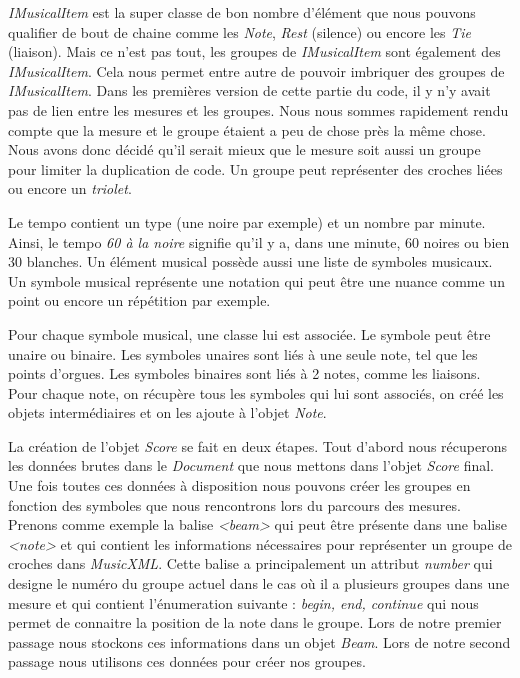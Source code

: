 \par
\emph{IMusicalItem} est la super classe de bon nombre d'élément que nous pouvons qualifier
de bout de chaine comme les \emph{Note}, \emph{Rest} (silence) ou encore les \emph{Tie} (liaison).
Mais ce n'est pas tout, les groupes de \emph{IMusicalItem} sont également des \emph{IMusicalItem}.
Cela nous permet entre autre de pouvoir imbriquer des groupes de \emph{IMusicalItem}.
Dans les premières version de cette partie du code, il y n'y avait pas de lien entre les
mesures et les groupes. Nous nous sommes rapidement rendu compte que la mesure et le groupe étaient
a peu de chose près la même chose. Nous avons donc décidé qu'il serait mieux que le mesure soit
aussi un groupe pour limiter la duplication de code. Un groupe peut représenter des croches liées ou
encore un \emph{triolet}.

\par
Le tempo contient un type (une noire par exemple) et un nombre par minute. Ainsi, le tempo \emph{60 à la noire} signifie qu'il y a,
dans une minute, 60 noires ou bien 30 blanches. Un élément musical possède aussi une liste de symboles
musicaux. Un symbole musical représente une notation qui peut être une nuance comme
un point ou encore un répétition par exemple.

\par
Pour chaque symbole musical, une classe lui est associée. Le symbole peut être unaire ou binaire.
Les symboles unaires sont liés à une seule note, tel que les points d'orgues. Les symboles binaires
sont liés à 2 notes, comme les liaisons. Pour chaque note, on récupère tous les symboles qui lui
sont associés, on créé les objets intermédiaires et on les ajoute à l'objet \emph{Note}.

\par
La création de l'objet \emph{Score} se fait en deux étapes. Tout d'abord nous récuperons
les données brutes dans le \emph{Document} que nous mettons dans l'objet \emph{Score} final.
Une fois toutes ces données à disposition nous pouvons créer les groupes en fonction des
symboles que nous rencontrons lors du parcours des mesures. Prenons comme exemple la
balise \emph{<beam>} qui peut être présente dans une balise \emph{<note>} et qui
contient les informations nécessaires pour représenter un groupe de
croches dans \emph{MusicXML}. Cette balise a principalement un attribut \emph{number} qui designe
le numéro du groupe actuel dans le cas où il a plusieurs groupes dans une mesure et
qui contient l'énumeration suivante : \emph{begin, end, continue} qui nous permet de
connaitre la position de la note dans le groupe. Lors de notre premier passage nous
stockons ces informations dans un objet \emph{Beam}. Lors de notre second passage
nous utilisons ces données pour créer nos groupes.

